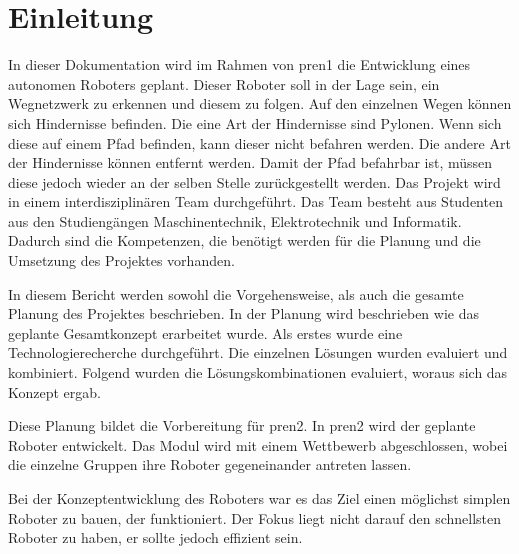 \section{Einleitung}

In dieser Dokumentation wird im Rahmen von \acrfull{pren1} die Entwicklung eines autonomen Roboters geplant. Dieser Roboter soll in der Lage sein, ein Wegnetzwerk zu erkennen und diesem zu folgen. Auf den einzelnen Wegen können sich Hindernisse befinden. Die eine Art der Hindernisse sind Pylonen. Wenn sich diese auf einem Pfad befinden, kann dieser nicht befahren werden. Die andere Art der Hindernisse können entfernt werden. Damit der Pfad befahrbar ist, müssen diese jedoch wieder an der selben Stelle zurückgestellt werden.
Das Projekt wird in einem interdisziplinären Team durchgeführt. Das Team besteht aus Studenten aus den Studiengängen Maschinentechnik, Elektrotechnik und Informatik. Dadurch sind die Kompetenzen, die benötigt werden für die Planung und die Umsetzung des Projektes vorhanden.

In diesem Bericht werden sowohl die Vorgehensweise, als auch die gesamte Planung des Projektes beschrieben. In der Planung wird beschrieben wie das geplante Gesamtkonzept erarbeitet wurde. Als erstes wurde eine Technologierecherche durchgeführt. Die einzelnen Lösungen wurden evaluiert und kombiniert. Folgend wurden die Lösungskombinationen evaluiert, woraus sich das Konzept ergab.

Diese Planung bildet die Vorbereitung für \acrfull{pren2}. In \acrshort{pren2} wird der geplante Roboter entwickelt. Das Modul wird mit einem Wettbewerb abgeschlossen, wobei die einzelne Gruppen ihre Roboter gegeneinander antreten lassen.

Bei der Konzeptentwicklung des Roboters war es das Ziel einen möglichst simplen Roboter zu bauen, der funktioniert. Der Fokus liegt nicht darauf den schnellsten Roboter zu haben, er sollte jedoch effizient sein.